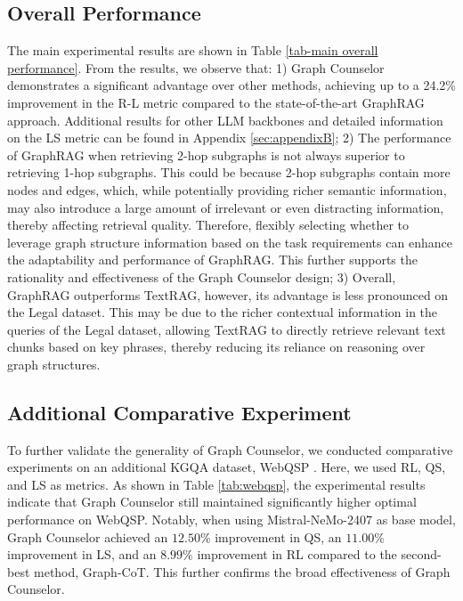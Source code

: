 \documentclass[11pt]{article}
\begin{document}
\subsection{Overall Performance}
The main experimental results are shown in Table \ref{tab-main overall performance}. From the results, we observe that: 1) Graph Counselor demonstrates a significant advantage over other methods, achieving up to a 24.2\% improvement in the R-L metric compared to the state-of-the-art GraphRAG approach. Additional results for other LLM backbones and detailed information on the LS metric can be found in Appendix \ref{sec:appendixB}; 2) The performance of GraphRAG when retrieving 2-hop subgraphs is not always superior to retrieving 1-hop subgraphs. This could be because 2-hop subgraphs contain more nodes and edges, which, while potentially providing richer semantic information, may also introduce a large amount of irrelevant or even distracting information, thereby affecting retrieval quality. Therefore, flexibly selecting whether to leverage graph structure information based on the task requirements can enhance the adaptability and performance of GraphRAG. This further supports the rationality and effectiveness of the Graph Counselor design; 3) Overall, GraphRAG outperforms TextRAG, however, its advantage is less pronounced on the Legal dataset. This may be due to the richer contextual information in the queries of the Legal dataset, allowing TextRAG to directly retrieve relevant text chunks based on key phrases, thereby reducing its reliance on reasoning over graph structures.

\subsection{Additional Comparative Experiment}
To further validate the generality of Graph Counselor, we conducted comparative experiments on an additional KGQA dataset, WebQSP \cite{yih2016value}. Here, we used RL, QS, and LS as metrics. As shown in Table \ref{tab:webqsp}, the experimental results indicate that Graph Counselor still maintained significantly higher optimal performance on WebQSP. Notably, when using Mistral-NeMo-2407 as base model, Graph Counselor achieved an $12.50\%$ improvement in QS, an $11.00\%$ improvement in LS, and an $8.99\%$ improvement in RL compared to the second-best method, Graph-CoT. This further confirms the broad effectiveness of Graph Counselor.
\end{document}
